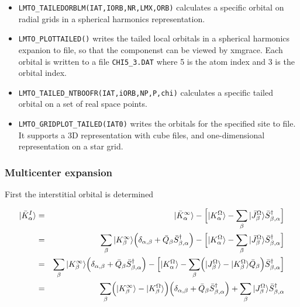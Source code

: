\documentclass[11pt,a4paper]{report}
\begin{document}
\begin{itemize}
\item \verb|LMTO_TAILEDORBLM(IAT,IORB,NR,LMX,ORB)| calculates a
  specific orbital on radial grids in a spherical harmonics
  representation.
%
\item \verb|LMTO_PLOTTAILED()| writes the tailed local orbitals in a
  spherical harmonics expanion to file, so that the componenst can be
  viewed by xmgrace. Each orbital is written to a file \verb|CHI5_3.DAT|
  where 5 is the atom index and 3 is the orbital index.
%
\item \verb|LMTO_TAILED_NTBOOFR(IAT,iORB,NP,P,chi)| calculates a
  specific tailed orbital on a set of real space points.
%
\item \verb|LMTO_GRIDPLOT_TAILED(IAT0)| writes the orbitals for the
  specified site to file. It supports a 3D representation with cube
  files, and one-dimensional representation on a star grid.
\end{itemize}

\subsubsection{Multicenter expansion}

First the interstitial orbital is determined

\begin{eqnarray}
|\bar{K}^I_\alpha\rangle&=&|\bar{K}^\infty_\alpha\rangle 
- \Bigl[ |K^\Omega_\alpha\rangle 
-\sum_\beta |\bar{J}^\Omega_\beta\rangle \bar{S}^\dagger_{\beta,\alpha}
\Bigr]
\nonumber\\
&=&\sum_\beta |K^\infty_\beta\rangle \Bigl(\delta_{\alpha,\beta}+\bar{Q}_\beta
\bar{S}^\dagger_{\beta,\alpha}\Bigr)
- \Bigl[ |K^\Omega_\alpha\rangle 
-\sum_\beta |\bar{J}^\Omega_\beta\rangle \bar{S}^\dagger_{\beta,\alpha}
\Bigr]
\nonumber\\
&=&\sum_\beta |K^\infty_\beta\rangle \Bigl(\delta_{\alpha,\beta}+\bar{Q}_\beta
\bar{S}^\dagger_{\beta,\alpha}\Bigr)
- \Bigl[ |K^\Omega_\alpha\rangle 
-\sum_\beta 
\Bigl(
|J^\Omega_\beta\rangle-|K^\Omega_\beta\rangle\bar{Q}_\beta\Bigr)
 \bar{S}^\dagger_{\beta,\alpha}
\Bigr]
\nonumber\\
&=&\sum_\beta 
\Bigl(|K^\infty_\beta\rangle -|K^\Omega_\beta\rangle \Bigr)
\Bigl(\delta_{\alpha,\beta}+\bar{Q}_\beta
\bar{S}^\dagger_{\beta,\alpha}\Bigr)
+\sum_\beta 
|J^\Omega_\beta\rangle\bar{S}^\dagger_{\beta,\alpha}
\end{eqnarray}
\end{document}

